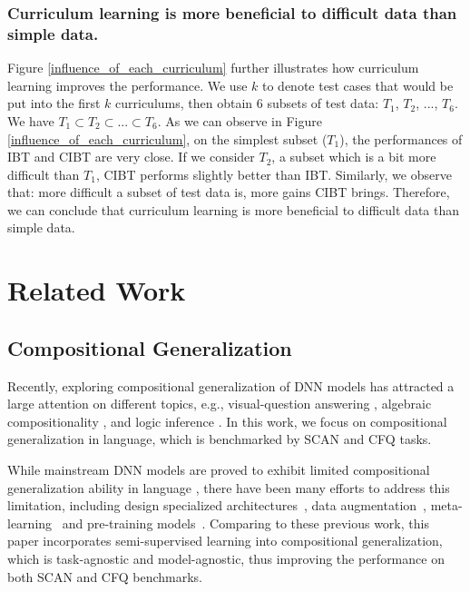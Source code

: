 \documentclass[letterpaper]{article} %
\begin{document}
\subsubsection{Curriculum learning is more beneficial to difficult data than simple data.}
Figure \ref{influence_of_each_curriculum} further illustrates how curriculum learning improves the performance.
We use $k$ to denote test cases that would be put into the first $k$ curriculums, then obtain 6 subsets of test data: $T_1$, $T_2$, ..., $T_6$.
We have $T_1\subset T_2\subset ... \subset T_6$.
As we can observe in Figure \ref{influence_of_each_curriculum}, on the simplest subset ($T_1$), the performances of IBT and CIBT are very close.
If we consider $T_2$, a subset which is a bit more difficult than $T_1$, CIBT performs slightly better than IBT.
Similarly, we observe that: more difficult a subset of test data is, more gains CIBT brings.
Therefore, we can conclude that curriculum learning is more beneficial to difficult data than simple data.



\section{Related Work}

\subsection{Compositional Generalization}
\label{sec:related_cg}
Recently, exploring compositional generalization of DNN models has attracted a large attention on different topics, e.g., visual-question answering \cite{hudson2018compositional}, algebraic compositionality \cite{veldhoen2016diagnostic,saxton2018analysing}, and logic inference \cite{bowman2015tree,mul2019siamese}.
In this work, we focus on compositional generalization in language, which is benchmarked by SCAN \cite{lake2018generalization} and CFQ \cite{keysers2020measuring} tasks.

While mainstream DNN models are proved to exhibit limited compositional generalization ability in language \cite{lake2018generalization,hupkes2020compositionality,keysers2020measuring,furrer2020compositional}, there have been many efforts to address this limitation, including
design specialized architectures~\cite{russin2019compositional,li2019compositional,gordon2019permutation,guo2020hierarchical,liu2020compositional}, data augmentation~\cite{jia-liang-2016-data,andreas-2020-good}, meta-learning~\cite{lake2019compositional,nye2020learning} and pre-training models~\cite{furrer2020compositional}.
Comparing to these previous work, this paper incorporates semi-supervised learning into compositional generalization, which is task-agnostic and model-agnostic, thus improving the performance on both SCAN and CFQ benchmarks.
\end{document}
